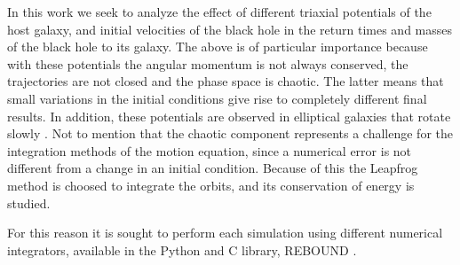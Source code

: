 	In this work we seek to analyze the effect of different triaxial potentials of the host galaxy, and initial velocities of the black hole in the return times and masses of the black hole to its galaxy. The above is of particular importance because with these potentials the angular momentum is not always conserved, the trajectories are not closed and the phase space is chaotic. The latter means that small variations in the initial conditions give rise to completely different final results. In addition, these potentials are observed in elliptical galaxies that rotate slowly \cite{buote2002chandra, binney1978elliptical}. Not to mention that the chaotic component represents a challenge for the integration methods of the motion equation, since a numerical error is not different from a change in an initial condition. Because of this the Leapfrog method is choosed to integrate the orbits, and its conservation of energy is studied.
	
	For this reason it is sought to perform each simulation using different numerical integrators, available in the Python and C library, REBOUND \cite{larson2017modeling}.
	
%	
